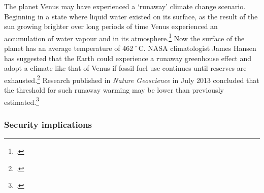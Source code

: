 \documentclass[10pt]{article}
\begin{document}
The planet Venus may have experienced a `runaway' climate change scenario.
Beginning in a state where liquid water existed on its surface, as the result of the sun growing brighter over long periods of time Venus experienced an accumulation of water vapour and  in its atmosphere.\footcite[][]{VenusRunaway}
Now the surface of the planet has an average temperature of 462˚C.
NASA climatologist James Hansen has suggested that the Earth could experience a runaway greenhouse effect and adopt a climate like that of Venus if fossil-fuel use continues until reserves are exhausted.\footcite[][p. 22-23]{HansenVenusThreat}
Research published in \emph{Nature Geoscience} in July 2013 concluded that the threshold for such runaway warming may be lower than previously estimated.\footcite[][]{Goldblatt2013}



	\subsubsection{Security implications}
	
	
	
\end{document}
